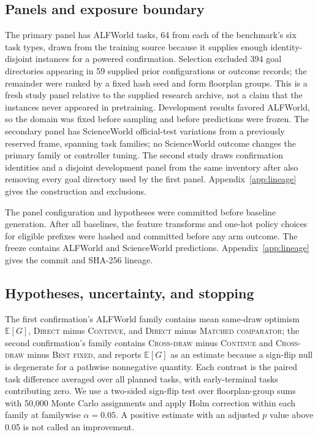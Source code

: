 \documentclass{article}
\begin{document}
\subsection{Panels and exposure boundary}

The primary panel has \AlfPlanned{} ALFWorld tasks, 64 from each of the benchmark's six task types, drawn from the training source because it supplies enough identity-disjoint instances for a powered confirmation. Selection excluded 394 goal directories appearing in 59 supplied prior configurations or outcome records; the remainder were ranked by a fixed hash seed and form \AlfGroups{} floorplan groups. This is a fresh study panel relative to the supplied research archive, not a claim that the instances never appeared in pretraining. Development results favored ALFWorld, so the domain was fixed before sampling and before predictions were frozen. The secondary panel has \SwPlanned{} ScienceWorld official-test variations from a previously reserved frame, spanning \SwGroups{} task families; no ScienceWorld outcome changes the primary family or controller tuning. The second study draws \EventPlanned{} confirmation identities and a disjoint development panel from the same inventory after also removing every goal directory used by the first panel. Appendix~\ref{app:lineage} gives the construction and exclusions.

The panel configuration and hypotheses were committed before baseline generation. After all baselines, the feature transforms and one-hot policy choices for \EligibleTotal{} eligible prefixes were hashed and committed before any arm outcome. The freeze contains \AlfEligible{} ALFWorld and \SwEligible{} ScienceWorld predictions. Appendix~\ref{app:lineage} gives the commit and SHA-256 lineage.

\subsection{Hypotheses, uncertainty, and stopping}

The first confirmation's ALFWorld family contains mean same-draw optimism $\mathbb E[G]$, \textsc{Direct} minus \textsc{Continue}, and \textsc{Direct} minus \textsc{Matched comparator}; the second confirmation's family contains \textsc{Cross-draw} minus \textsc{Continue} and \textsc{Cross-draw} minus \textsc{Best fixed}, and reports $\mathbb E[G]$ as an estimate because a sign-flip null is degenerate for a pathwise nonnegative quantity. Each contrast is the paired task difference averaged over all planned tasks, with early-terminal tasks contributing zero. We use a two-sided sign-flip test over floorplan-group sums with 50,000 Monte Carlo assignments and apply Holm correction within each family at familywise $\alpha=0.05$. A positive estimate with an adjusted $p$ value above 0.05 is not called an improvement.
\end{document}
